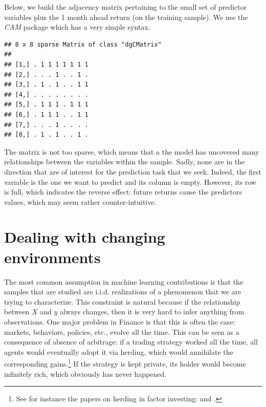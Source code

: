 \documentclass[]{krantz}
\makeatletter
\newenvironment{Shaded}{\begin{snugshade}}{\end{snugshade}}
\newcommand{\KeywordTok}[1]{\textcolor[rgb]{0.27,0.27,0.27}{\textbf{#1}}}
\newcommand{\NormalTok}[1]{#1}
\newcommand{\OperatorTok}[1]{\textcolor[rgb]{0.43,0.43,0.43}{\textbf{#1}}}
\newcommand{\StringTok}[1]{\textcolor[rgb]{0.5,0.5,0.5}{#1}}
\newenvironment{kframe}{%
\medskip{}
\setlength{\fboxsep}{.8em}
 \def\at@end@of@kframe{}%
 \ifinner\ifhmode%
  \def\at@end@of@kframe{\end{minipage}}%
  \begin{minipage}{\columnwidth}%
 \fi\fi%
 \def\FrameCommand##1{\hskip\@totalleftmargin \hskip-\fboxsep
 \colorbox{shadecolor}{##1}\hskip-\fboxsep
     \hskip-\linewidth \hskip-\@totalleftmargin \hskip\columnwidth}%
 \MakeFramed {\advance\hsize-\width
   \@totalleftmargin\z@ \linewidth\hsize
   \@setminipage}}%
 {\par\unskip\endMakeFramed%
 \at@end@of@kframe}
\renewenvironment{Shaded}{\begin{kframe}}{\end{kframe}}
\let\rmarkdownfootnote\footnote%
\def\footnote{\protect\rmarkdownfootnote}
\theoremstyle{definition}
\theoremstyle{definition}
\theoremstyle{definition}
\theoremstyle{remark}
\makeatother
\begin{document}
Below, we build the adjacency matrix pertaining to the small set of
predictor variables plus the 1 month ahead return (on the training
sample). We use the \emph{CAM} package which has a very simple syntax.

\footnotesize

\begin{Shaded}
\end{Shaded}

\begin{verbatim}
## 8 x 8 sparse Matrix of class "dgCMatrix"
##                     
## [1,] . 1 1 1 1 1 1 1
## [2,] . . . 1 . . 1 .
## [3,] . 1 . 1 . . 1 1
## [4,] . . . . . . . .
## [5,] . 1 1 1 . 1 1 1
## [6,] . 1 1 1 . . 1 1
## [7,] . . . 1 . . . .
## [8,] . 1 . 1 . . 1 .
\end{verbatim}

\normalsize

The matrix is not too sparse, which means that a the model has uncovered
many relationships between the variables within the sample. Sadly, none
are in the direction that are of interest for the prediction task that
we seek. Indeed, the first variable is the one we want to predict and
its column is empty. However, its row is full, which indicates the
reverse effect: future returns cause the predictors values, which may
seem rather counter-intuitive.

\hypertarget{nonstat}{%
\section{Dealing with changing environments}\label{nonstat}}

The most common assumption in machine learning contributions is that the
samples that are studied are i.i.d. realizations of a phenomenon that we
are trying to characterize. This constraint is natural because if the
relationship between \(X\) and \(y\) always changes, then it is very
hard to infer anything from observations. One major problem in Finance
is that this is often the case: markets, behaviors, policies, etc.,
evolve all the time. This can be seen as a consequence of absence of
arbitrage: if a trading strategy worked all the time, all agents would
eventually adopt it via herding, which would annihilate the
corresponding gains.\footnote{See for instance the papers on herding in
  factor investing: \citet{krkoska2019herding} and
  \citet{santi2018exploring}.} If the strategy is kept private, its
holder would become infinitely rich, which obviously has never happened.
\end{document}
